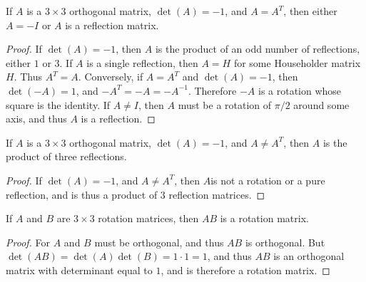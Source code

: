 \documentclass[crop=false,class=book,oneside]{standalone}                      %
\begin{document}
        \begin{theorem}
        If $A$ is a $3\times 3$ orthogonal matrix, $\det(A) = -1$, and $A=A^T$, then either $A=-I$ or $A$ is a reflection matrix.
        \end{theorem}
        \begin{proof}
        If $\det(A)=-1$, then $A$ is the product of an odd number of reflections, either $1$ or $3$. If $A$ is a single reflection, then $A=H$ for some Householder matrix $H$. Thus $A^T = A$. Conversely, if $A = A^T$ and $\det(A) = -1$, then $\det(-A) = 1$, and $-A^T = -A = -A^{-1}$. Therefore $-A$ is a rotation whose square is the identity. If $A\ne I$, then $A$ must be a rotation of $\pi/2$ around some axis, and thus $A$ is a reflection.
        \end{proof}
        \begin{theorem}
        If $A$ is a $3\times 3$ orthogonal matrix, $\det(A) = -1$, and $A\ne A^T$, then $A$ is the product of three reflections.
        \end{theorem}
        \begin{proof}
        If $\det(A) = -1$, and $A\ne A^T$, then $A$is not a rotation or a pure reflection, and is thus a product of $3$ reflection matrices.
        \end{proof}
        \begin{theorem}
        If $A$ and $B$ are $3\times 3$ rotation matrices, then $AB$ is a rotation matrix.
        \end{theorem}
        \begin{proof}
        For $A$ and $B$ must be orthogonal, and thus $AB$ is orthogonal. But $\det(AB) = \det(A)\det(B) = 1\cdot 1 = 1$, and thus $AB$ is an orthogonal matrix with determinant equal to $1$, and is therefore a rotation matrix.
        \end{proof}
\end{document}
